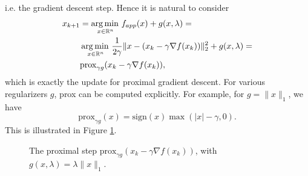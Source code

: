 \documentclass[11pt, twoside]{report}
\begin{document}
i.e. the gradient descent step. Hence it is natural to consider
\begin{align*}
    x_{k+1} &= \operatorname*{arg\, min \,}_{x \in \mathbb{R}^n} f_{app}(x) + g(x,\lambda) = \\
    &\operatorname*{arg\, min \,}_{x \in \mathbb{R}^n} \frac{1}{2 \gamma} \|x - (x_k - \gamma \nabla f(x_k))\|_2^2 + g(x,\lambda) = \\
    &\mathrm{prox}_{\gamma g}(x_k - \gamma \nabla f(x_k)),
\end{align*}
which is exactly the update for proximal gradient descent. For various regularizers $g$, prox can be computed explicitly. For example, for $g = \|x\|_1$, we have $$\mathrm{prox}_{\gamma g}(x) = \mathrm{sign}(x) \max(|x|-\gamma,0).$$ This is illustrated in Figure \ref{fig:prox_lasso}.

\begin{figure}[h!]
    \centering
    \caption{The proximal step $\mathrm{prox}_{\gamma g}(x_k - \gamma \nabla f(x_k))$, with $g(x,\lambda) = \lambda \|x\|_1$.}
    \label{fig:prox_lasso}
\end{figure}
\end{document}
